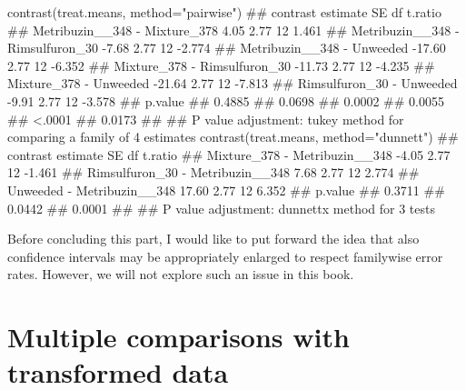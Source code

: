\documentclass[a4paper,12pt,oneside]{book}
\newenvironment{Shaded}{\begin{snugshade}}{\end{snugshade}}
\newcommand{\StringTok}[1]{#1}
\newcommand{\DocumentationTok}[1]{#1}
\newcommand{\FunctionTok}[1]{#1}
\newcommand{\AttributeTok}[1]{#1}
\newcommand{\NormalTok}[1]{#1}
\begin{document}
\small

\begin{Shaded}
\begin{Highlighting}[]
\FunctionTok{contrast}\NormalTok{(treat.means, }\AttributeTok{method=}\StringTok{"pairwise"}\NormalTok{)}
\DocumentationTok{\#\#  contrast                         estimate   SE df t.ratio}
\DocumentationTok{\#\#  Metribuzin\_\_348 {-} Mixture\_378        4.05 2.77 12  1.461 }
\DocumentationTok{\#\#  Metribuzin\_\_348 {-} Rimsulfuron\_30    {-}7.68 2.77 12 {-}2.774 }
\DocumentationTok{\#\#  Metribuzin\_\_348 {-} Unweeded         {-}17.60 2.77 12 {-}6.352 }
\DocumentationTok{\#\#  Mixture\_378 {-} Rimsulfuron\_30       {-}11.73 2.77 12 {-}4.235 }
\DocumentationTok{\#\#  Mixture\_378 {-} Unweeded             {-}21.64 2.77 12 {-}7.813 }
\DocumentationTok{\#\#  Rimsulfuron\_30 {-} Unweeded           {-}9.91 2.77 12 {-}3.578 }
\DocumentationTok{\#\#  p.value}
\DocumentationTok{\#\#  0.4885 }
\DocumentationTok{\#\#  0.0698 }
\DocumentationTok{\#\#  0.0002 }
\DocumentationTok{\#\#  0.0055 }
\DocumentationTok{\#\#  \textless{}.0001 }
\DocumentationTok{\#\#  0.0173 }
\DocumentationTok{\#\# }
\DocumentationTok{\#\# P value adjustment: tukey method for comparing a family of 4 estimates}
\FunctionTok{contrast}\NormalTok{(treat.means, }\AttributeTok{method=}\StringTok{"dunnett"}\NormalTok{)}
\DocumentationTok{\#\#  contrast                         estimate   SE df t.ratio}
\DocumentationTok{\#\#  Mixture\_378 {-} Metribuzin\_\_348       {-}4.05 2.77 12 {-}1.461 }
\DocumentationTok{\#\#  Rimsulfuron\_30 {-} Metribuzin\_\_348     7.68 2.77 12  2.774 }
\DocumentationTok{\#\#  Unweeded {-} Metribuzin\_\_348          17.60 2.77 12  6.352 }
\DocumentationTok{\#\#  p.value}
\DocumentationTok{\#\#  0.3711 }
\DocumentationTok{\#\#  0.0442 }
\DocumentationTok{\#\#  0.0001 }
\DocumentationTok{\#\# }
\DocumentationTok{\#\# P value adjustment: dunnettx method for 3 tests}
\end{Highlighting}
\end{Shaded}

\normalsize

Before concluding this part, I would like to put forward the idea that also confidence intervals may be appropriately enlarged to respect familywise error rates. However, we will not explore such an issue in this book.

\hypertarget{multiple-comparisons-with-transformed-data}{%
\section{Multiple comparisons with transformed data}\label{multiple-comparisons-with-transformed-data}}
\end{document}
